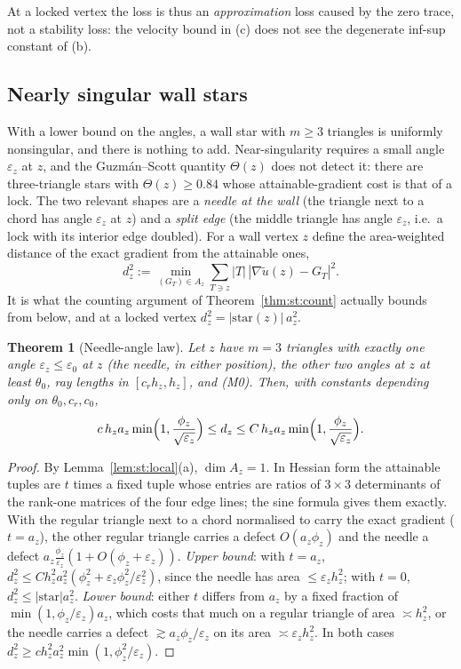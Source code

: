\documentclass[pdflatex,sn-mathphys-num]{sn-jnl}
\theoremstyle{thmstyleone}
\newtheorem{theorem}{Theorem}[section]
\theoremstyle{thmstylethree}
\newcommand{\ut}{\tilde u}
\begin{document}
At a locked vertex the loss is thus an \emph{approximation} loss caused by the zero trace, not a stability loss: the velocity bound in (c) does not see the degenerate inf-sup constant of (b).

\subsection{Nearly singular wall stars}
With a lower bound on the angles, a wall star with $m\ge3$ triangles is uniformly nonsingular, and there is nothing to add. Near-singularity requires a small angle $\varepsilon_z$ at $z$, and the Guzm\'an--Scott quantity $\Theta(z)$ does not detect it: there are three-triangle stars with $\Theta(z)\ge0.84$ whose attainable-gradient cost is that of a lock. The two relevant shapes are a \emph{needle at the wall} (the triangle next to a chord has angle $\varepsilon_z$ at $z$) and a \emph{split edge} (the middle triangle has angle $\varepsilon_z$, i.e.\ a lock with its interior edge doubled). For a wall vertex $z$ define the area-weighted distance of the exact gradient from the attainable ones,
\[
d_z^2:=\min_{(G_T)\in A_z}\sum_{T\ni z}|T|\,|\nabla\ut(z)-G_T|^2 .
\]
It is what the counting argument of Theorem~\ref{thm:st:count} actually bounds from below, and at a locked vertex $d_z^2=|\text{star}(z)|\,a_z^2$.

\begin{theorem}[Needle-angle law]\label{thm:st:needle}
Let $z$ have $m=3$ triangles with exactly one angle $\varepsilon_z\le\varepsilon_0$ at $z$ (the needle, in either position), the other two angles at $z$ at least $\theta_0$, ray lengths in $[c_rh_z,h_z]$, and (M0). Then, with constants depending only on $\theta_0,c_r,c_0$,
\[
c\,h_za_z\min\Bigl(1,\frac{\phi_z}{\sqrt{\varepsilon_z}}\Bigr)\le d_z\le C\,h_za_z\min\Bigl(1,\frac{\phi_z}{\sqrt{\varepsilon_z}}\Bigr).
\]
\end{theorem}

\begin{proof}
By Lemma~\ref{lem:st:local}(a), $\dim A_z=1$. In Hessian form the attainable tuples are $t$ times a fixed tuple whose entries are ratios of $3\times3$ determinants of the rank-one matrices of the four edge lines; the sine formula gives them exactly. With the regular triangle next to a chord normalised to carry the exact gradient ($t=a_z$), the other regular triangle carries a defect $O(a_z\phi_z)$ and the needle a defect $a_z\frac{\phi_z}{\varepsilon_z}(1+O(\phi_z+\varepsilon_z))$. \emph{Upper bound}: with $t=a_z$, $d_z^2\le Ch_z^2a_z^2(\phi_z^2+\varepsilon_z\phi_z^2/\varepsilon_z^2)$, since the needle has area $\le\varepsilon_zh_z^2$; with $t=0$, $d_z^2\le|\text{star}|a_z^2$. \emph{Lower bound}: either $t$ differs from $a_z$ by a fixed fraction of $\min(1,\phi_z/\varepsilon_z)a_z$, which costs that much on a regular triangle of area $\asymp h_z^2$, or the needle carries a defect $\gtrsim a_z\phi_z/\varepsilon_z$ on its area $\asymp\varepsilon_zh_z^2$. In both cases $d_z^2\ge ch_z^2a_z^2\min(1,\phi_z^2/\varepsilon_z)$.
\end{proof}
\end{document}
